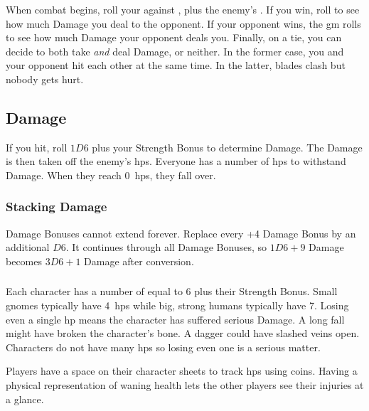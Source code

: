 \begin{multicols}{2}
When combat begins, roll your  against \tn[7], plus the enemy's .
If you win, roll to see how much Damage you deal to the opponent.
If your opponent wins, the \gls{gm} rolls to see how much Damage your opponent deals you.
Finally, on a tie, you can decide to both take \emph{and} deal Damage, or neither.
In the former case, you and your opponent hit each other at the same time.
In the latter, blades clash but nobody gets hurt.

\begin{figure*}[t!]
  \stackingDamageChart
\end{figure*}

\subsection{Damage}

If you hit, roll $1D6$ plus your Strength Bonus to determine Damage.
The Damage is then taken off the enemy's \glspl{hp}.
Everyone has a number of \glspl{hp} to withstand Damage.
When they reach 0~\glspl{hp}, they fall over.

\subsubsection{Stacking Damage}
\label{stackingDamage}

Damage Bonuses cannot extend forever.
Replace every +4 Damage Bonus by an additional $D6$.
It continues through all Damage Bonuses, so $1D6+9$ Damage becomes $3D6+1$ Damage after conversion.

\subsubsection{}

Each character has a number of  equal to 6 plus their Strength Bonus.
Small gnomes typically have 4~\glspl{hp} while big, strong humans typically have 7.
Losing even a single \gls{hp} means the character has suffered serious Damage.
A long fall might have broken the character's bone.
A dagger could have slashed veins open.
Characters do not have many \glspl{hp} so losing even one is a serious matter.

Players have a space on their character sheets to track \glspl{hp} using coins.
Having a physical representation of waning health lets the other players see their injuries at a glance.


\end{multicols}
